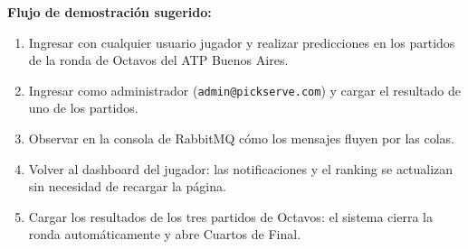 \documentclass[12pt, a4paper]{article}
\begin{document}
\textbf{Flujo de demostración sugerido:}
\begin{enumerate}[noitemsep]
  \item Ingresar con cualquier usuario jugador y realizar predicciones en los partidos de la ronda de Octavos del ATP Buenos Aires.
  \item Ingresar como administrador (\texttt{admin@pickserve.com}) y cargar el resultado de uno de los partidos.
  \item Observar en la consola de RabbitMQ cómo los mensajes fluyen por las colas.
  \item Volver al dashboard del jugador: las notificaciones y el ranking se actualizan sin necesidad de recargar la página.
  \item Cargar los resultados de los tres partidos de Octavos: el sistema cierra la ronda automáticamente y abre Cuartos de Final.
\end{enumerate}
\end{document}
